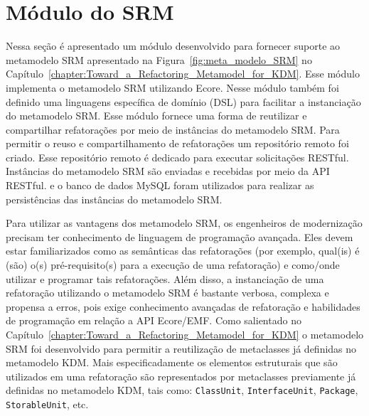 \section{Módulo do SRM}

Nessa seção é apresentado um módulo desenvolvido para fornecer suporte ao metamodelo SRM apresentado na Figura~\ref{fig:meta_modelo_SRM} no  Capítulo~\ref{chapter:Toward_a_Refactoring_Metamodel_for_KDM}. Esse módulo implementa o metamodelo SRM utilizando Ecore. Nesse módulo também foi definido uma linguagens específica de domínio (DSL) para facilitar a instanciação do metamodelo SRM. Esse módulo fornece uma forma de reutilizar e compartilhar refatorações por meio de instâncias do metamodelo SRM. Para permitir o reuso e compartilhamento de refatorações um repositório remoto foi criado. Esse repositório remoto é dedicado para executar solicitações RESTful. Instâncias do metamodelo SRM são enviadas e recebidas por meio da API RESTful. e o banco de dados MySQL foram utilizados para realizar as persistências das instâncias do metamodelo SRM.

Para utilizar as vantagens dos metamodelo SRM, os engenheiros de modernização precisam ter conhecimento de linguagem de programação avançada. Eles devem estar familiarizados como as semânticas das refatorações (por exemplo, qual(is) é (são) o(s) pré-requisito(s) para a execução de uma refatoração) e como/onde utilizar e programar tais refatorações. Além disso, a instanciação de uma refatoração utilizando o metamodelo SRM é bastante verbosa, complexa e propensa a erros, pois exige conhecimento avançadas de refatoração e habilidades de programação em relação a API Ecore/EMF. Como salientado no Capítulo~\ref{chapter:Toward_a_Refactoring_Metamodel_for_KDM} o metamodelo SRM foi desenvolvido para permitir a reutilização de metaclasses já definidas no metamodelo KDM. Mais especificadamente os elementos estruturais que são utilizados em uma refatoração são representados por metaclasses previamente já definidas no metamodelo KDM, tais como: \texttt{ClassUnit}, \texttt{InterfaceUnit}, \texttt{Package}, \texttt{StorableUnit}, etc.


